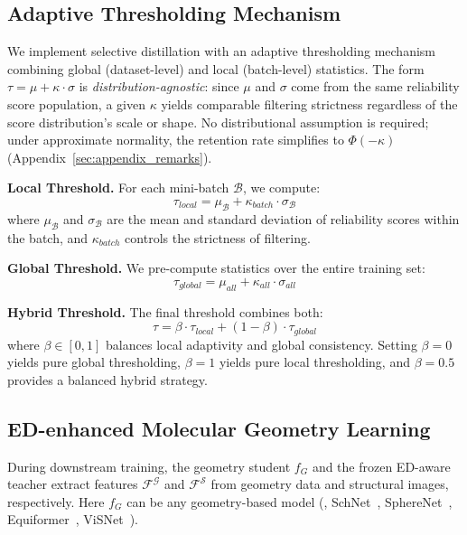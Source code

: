 \subsection{Adaptive Thresholding Mechanism}
\label{sec:Adaptive_Thresholding}

We implement selective distillation with an adaptive thresholding mechanism combining global (dataset-level) and local (batch-level) statistics. The form $\tau = \mu + \kappa \cdot \sigma$ is \emph{distribution-agnostic}: since $\mu$ and $\sigma$ come from the same reliability score population, a given $\kappa$ yields comparable filtering strictness regardless of the score distribution's scale or shape. No distributional assumption is required; under approximate normality, the retention rate simplifies to $\Phi(-\kappa)$ (Appendix~\ref{sec:appendix_remarks}).

\textbf{Local Threshold.} For each mini-batch $\mathcal{B}$, we compute:
\begin{equation}
    \tau_{local} = \mu_\mathcal{B} + \kappa_{batch} \cdot \sigma_\mathcal{B}
\end{equation}
where $\mu_\mathcal{B}$ and $\sigma_\mathcal{B}$ are the mean and standard deviation of reliability scores within the batch, and $\kappa_{batch}$ controls the strictness of filtering.

\textbf{Global Threshold.} We pre-compute statistics over the entire training set:
\begin{equation}
    \tau_{global} = \mu_{all} + \kappa_{all} \cdot \sigma_{all}
\end{equation}

\textbf{Hybrid Threshold.} The final threshold combines both:
\begin{equation}
    \tau = \beta \cdot \tau_{local} + (1 - \beta) \cdot \tau_{global}
\end{equation}
where $\beta \in [0, 1]$ balances local adaptivity and global consistency. Setting $\beta = 0$ yields pure global thresholding, $\beta = 1$ yields pure local thresholding, and $\beta = 0.5$ provides a balanced hybrid strategy.

\subsection{ED-enhanced Molecular Geometry Learning}
\label{sec:ED-enhanced_Molecular_Geometry_Learning}

During downstream training, the geometry student $f_{G}$ and the frozen ED-aware teacher extract features $\mathcal{F}^{\mathcal{G}}$ and $\mathcal{F}^{\mathcal{S}}$ from geometry data and structural images, respectively. Here $f_{G}$ can be any geometry-based model (\eg, SchNet~\cite{schutt2017schnet}, SphereNet~\cite{liu2022spherical}, Equiformer~\cite{liao2023equiformer}, ViSNet~\cite{wang2024enhancing}).

